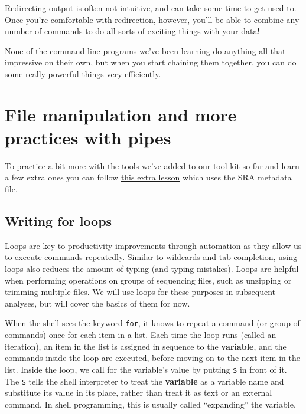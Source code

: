 \documentclass[
  letterpaper,
  DIV=11,
  numbers=noendperiod]{scrreprt}
\begin{document}
Redirecting output is often not intuitive, and can take some time to get
used to. Once you're comfortable with redirection, however, you'll be
able to combine any number of commands to do all sorts of exciting
things with your data!

None of the command line programs we've been learning do anything all
that impressive on their own, but when you start chaining them together,
you can do some really powerful things very efficiently.


\chapter{File manipulation and more practices with
pipes}\label{file-manipulation-and-more-practices-with-pipes}

To practice a bit more with the tools we've added to our tool kit so far
and learn a few extra ones you can follow
\href{https://datacarpentry.org/shell-genomics/Extra_lesson/index.html}{this
extra lesson} which uses the SRA metadata file.

\section{Writing for loops}\label{writing-for-loops}

Loops are key to productivity improvements through automation as they
allow us to execute commands repeatedly. Similar to wildcards and tab
completion, using loops also reduces the amount of typing (and typing
mistakes). Loops are helpful when performing operations on groups of
sequencing files, such as unzipping or trimming multiple files. We will
use loops for these purposes in subsequent analyses, but will cover the
basics of them for now.

When the shell sees the keyword \texttt{for}, it knows to repeat a
command (or group of commands) once for each item in a list. Each time
the loop runs (called an iteration), an item in the list is assigned in
sequence to the \textbf{variable}, and the commands inside the loop are
executed, before moving on to the next item in the list. Inside the
loop, we call for the variable's value by putting \texttt{\$} in front
of it. The \texttt{\$} tells the shell interpreter to treat the
\textbf{variable} as a variable name and substitute its value in its
place, rather than treat it as text or an external command. In shell
programming, this is usually called ``expanding'' the variable.
\end{document}
